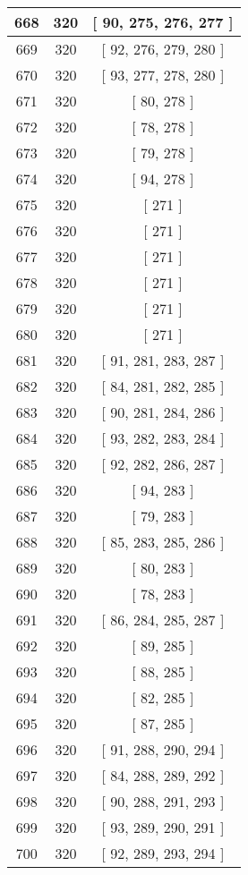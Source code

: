 \begin{center}
\begin{longtable}[H]{|| c c c ||}
\hline
668 & 320 & [ 90, 275, 276, 277 ] \\ 
\hline
669 & 320 & [ 92, 276, 279, 280 ] \\ 
\hline
670 & 320 & [ 93, 277, 278, 280 ] \\ 
\hline
671 & 320 & [ 80, 278 ] \\ 
\hline
672 & 320 & [ 78, 278 ] \\ 
\hline
673 & 320 & [ 79, 278 ] \\ 
\hline
674 & 320 & [ 94, 278 ] \\ 
\hline
675 & 320 & [ 271 ] \\ 
\hline
676 & 320 & [ 271 ] \\ 
\hline
677 & 320 & [ 271 ] \\ 
\hline
678 & 320 & [ 271 ] \\ 
\hline
679 & 320 & [ 271 ] \\ 
\hline
680 & 320 & [ 271 ] \\ 
\hline
681 & 320 & [ 91, 281, 283, 287 ] \\ 
\hline
682 & 320 & [ 84, 281, 282, 285 ] \\ 
\hline
683 & 320 & [ 90, 281, 284, 286 ] \\ 
\hline
684 & 320 & [ 93, 282, 283, 284 ] \\ 
\hline
685 & 320 & [ 92, 282, 286, 287 ] \\ 
\hline
686 & 320 & [ 94, 283 ] \\ 
\hline
687 & 320 & [ 79, 283 ] \\ 
\hline
688 & 320 & [ 85, 283, 285, 286 ] \\ 
\hline
689 & 320 & [ 80, 283 ] \\ 
\hline
690 & 320 & [ 78, 283 ] \\ 
\hline
691 & 320 & [ 86, 284, 285, 287 ] \\ 
\hline
692 & 320 & [ 89, 285 ] \\ 
\hline
693 & 320 & [ 88, 285 ] \\ 
\hline
694 & 320 & [ 82, 285 ] \\ 
\hline
695 & 320 & [ 87, 285 ] \\ 
\hline
696 & 320 & [ 91, 288, 290, 294 ] \\ 
\hline
697 & 320 & [ 84, 288, 289, 292 ] \\ 
\hline
698 & 320 & [ 90, 288, 291, 293 ] \\ 
\hline
699 & 320 & [ 93, 289, 290, 291 ] \\ 
\hline
700 & 320 & [ 92, 289, 293, 294 ] \\ 

\end{longtable}
\end{center}
